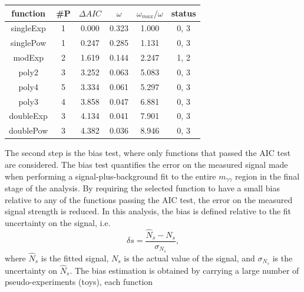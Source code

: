 \begin{table}[h] 
\begin{center} 
\begin{tabular}{|c|c|ccc|c|} 
\hline function & \#P & $\Delta AIC$ & $\omega$ & $\omega_{max}/\omega$ & status \\ \hline 
\rowcolor[rgb]{0.31,0.78,0.47}  
singleExp &  1 &  0.000 &  0.323 &  1.000 &  0,  3 \\ 
\rowcolor[rgb]{0.31,0.78,0.47}  
singlePow &  1 &  0.247 &  0.285 &  1.131 &  0,  3 \\ 
\rowcolor[rgb]{0.31,0.78,0.47}  
modExp &  2 &  1.619 &  0.144 &  2.247 &  1,  2 \\ 
\rowcolor[rgb]{1.0,0.41,0.38}  
poly2 &  3 &  3.252 &  0.063 &  5.083 &  0,  3 \\ 
\rowcolor[rgb]{1.0,0.41,0.38}  
poly4 &  5 &  3.334 &  0.061 &  5.297 &  0,  3 \\ 
\rowcolor[rgb]{1.0,0.41,0.38}  
poly3 &  4 &  3.858 &  0.047 &  6.881 &  0,  3 \\ 
\rowcolor[rgb]{1.0,0.41,0.38}  
doubleExp &  3 &  4.134 &  0.041 &  7.901 &  0,  3 \\ 
\rowcolor[rgb]{1.0,0.41,0.38}  
doublePow &  3 &  4.382 &  0.036 &  8.946 &  0,  3 \\ 
\hline 
\end{tabular} 
\label{tab:AICresults4} 
\end{center} 
\end{table} 
\clearpage
The second step is the bias test, where only functions that passed the
AIC test are considered. The bias test quantifies the error on the
measured signal made when
performing a signal-plus-background fit to the entire
$m_{\gamma\gamma}$ region in the final stage of the analysis. By
requiring the selected function to have a small bias relative to any of
the functions passing the AIC test, the error on the measured signal
strength is reduced. In this analysis, the bias is defined relative to
the fit uncertainty on the signal, i.e.
\begin{equation}
\label{eq:bias}
\delta s = \frac{\hat{N}_{s}-N_{s}}{\sigma_{N_{s}}},
\end{equation}
where $\hat{N}_{s}$ is the fitted signal, $N_{s}$ is the
actual value of the signal, and $\sigma_{N_{s}}$ is the
uncertainty on $\hat{N}_{s}$. The bias estimation is obtained by
carrying a large number of pseudo-experiments (toys), each function
